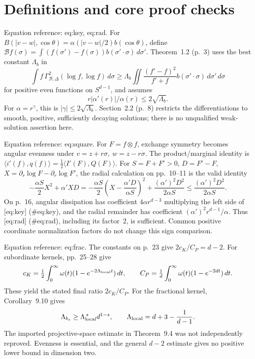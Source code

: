 \documentclass[10pt]{article}
\begin{document}
\section*{Definitions and core proof checks}
Equation reference: eq:key, eq:rad. For \(B(|v-w|,\cos\theta)=\alpha(|v-w|/2)b(\cos\theta)\), define \(\mathcal Bf(\sigma)=\int(f(\sigma')-f(\sigma))b(\sigma'\cdot\sigma)\,d\sigma'\). Theorem 1.2 (p. 3) uses the best constant \(\Lambda_b\) in \[
 \int f\,\Gamma^2_{\mathcal B,\Delta}(\log f,\log f)\,d\sigma
 \geq\Lambda_b\iint\frac{(f'-f)^2}{f'+f}b(\sigma'\cdot\sigma)\,d\sigma'\,d\sigma\] for positive even functions on \(S^{d-1}\), and assumes \[
 r|\alpha'(r)|/\alpha(r)\leq2\sqrt{\Lambda_b}.\] For \(\alpha=r^\gamma\), this is \(|\gamma|\leq2\sqrt{\Lambda_b}\). Section 2.2 (p. 8) restricts the differentiations to smooth, positive, sufficiently decaying solutions; there is no unqualified weak-solution assertion here.\par
Equation reference: eq:square. For \(F=f\otimes f\), exchange symmetry becomes angular evenness under \(v=z+r\sigma,\ w=z-r\sigma\). The product/marginal identity is \(\langle i'(f),q(f)\rangle=\tfrac12\langle I'(F),Q(F)\rangle\). For \(S=F+F'>0\), \(D=F'-F\), \(X=\partial_r\log F-\partial_r\log F'\), the radial calculation on pp. 10–11 is the valid identity \[
 -\frac{\alpha S}{2}X^2+\alpha'XD
 =-\frac{\alpha S}{2}\left(X-\frac{\alpha'D}{\alpha S}\right)^2
 +\frac{(\alpha')^2D^2}{2\alpha S}
 \leq\frac{(\alpha')^2D^2}{2\alpha S}.\] On p. 16, angular dissipation has coefficient \(4\alpha r^{d-3}\) multiplying the left side of [eq:key] (\#eq:key), and the radial remainder has coefficient \((\alpha')^2r^{d-1}/\alpha\). Thus [eq:rad] (\#eq:rad), including its factor 2, is sufficient. Common positive coordinate normalization factors do not change this sign comparison.\par
Equation reference: eq:frac. The constants on p. 23 give \(2c_K/C_P=d-2\). For subordinate kernels, pp. 25–28 give \[c_K=\tfrac12\int_0^\infty\omega(t)(1-e^{-2\Lambda_{\rm local}t})\,dt,\qquad
 C_P=\tfrac1d\int_0^\infty\omega(t)(1-e^{-2dt})\,dt.\] These yield the stated final ratio \(2c_K/C_P\). For the fractional kernel, Corollary 9.10 gives \[
 \Lambda_{b_s}\geq\Lambda_{\rm local}^{\,s}d^{1-s},
 \qquad \Lambda_{\rm local}=d+3-\frac1{d-1}.\] The imported projective-space estimate in Theorem 9.4 was not independently reproved. Evenness is essential, and the general \(d-2\) estimate gives no positive lower bound in dimension two.\par
\end{document}
